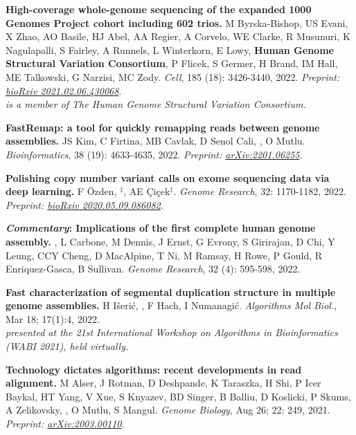 \vspace{-.2cm}
    {\bf High-coverage whole-genome sequencing of the expanded 1000 Genomes Project cohort including 602 trios.} M Byrska-Bishop, US Evani, X Zhao, AO Basile, HJ Abel, AA Regier, A Corvelo, WE Clarke, R Musunuri, K Nagulapalli, S Fairley, A Runnels, L Winterkorn, E Lowy, \textbf{Human Genome Structural Variation Consortium}, P Flicek, S Germer, H Brand, IM Hall, ME Talkowski, G Narzisi, MC Zody. {\it Cell}, 185 (18): 3426-3440, 2022.
    \textit{Preprint: \href{https://doi.org/10.1101/2021.02.06.430068}{bioRxiv 2021.02.06.430068}}.\\
    \hspace*{1cm}
    {\footnotesize \em \calkan{} is a member of The Human Genome Structural Variation Consortium.}

\vspace{-.2cm}
    {\bf FastRemap: a tool for quickly remapping reads between genome assemblies.}
    JS Kim, C Firtina, MB Cavlak, D Senol Cali, \calkan{}, O Mutlu.
    {\it Bioinformatics}, 38 (19): 4633-4635, 2022. \textit{Preprint: \href{https://doi.org/10.48550/arXiv.2201.06255}{arXiv:2201.06255}}.

\vspace{-.2cm}
    {\bf Polishing copy number variant calls on exome sequencing data via deep learning.}
    F Özden, \calkan{}$^\ddag$, AE Çiçek$^\ddag$. {\it Genome Research}, 32: 1170-1182, 2022. \textit{Preprint: \href{https://doi.org/10.1101/2020.05.09.086082}{bioRxiv 2020.05.09.086082}}.
    
\vspace{-.2cm}
    {\bf \textit{Commentary}: Implications of the first complete human genome assembly.} \calkan{}, L Carbone, M Dennis, J Ernst, G Evrony, S Girirajan, D Chi, Y Leung, CCY Cheng, D MacAlpine, T Ni, M Ramsay, H Rowe, P Gould, R Enriquez-Gasca, B Sullivan. {\it Genome Research}, 32 (4): 595-598, 2022.

\vspace{-.2cm}
    {\bf Fast characterization of segmental duplication structure in multiple genome assemblies.}
    H Išerić, \calkan{}, F Hach, I Numanagić.
    {\it Algorithms Mol Biol.}, Mar 18; 17(1):4, 2022.\\
    \hspace*{1cm}
    {\footnotesize \em presented at the 21st International Workshop on Algorithms in Bioinformatics (WABI 2021), held virtually.}


\vspace{-.2cm}
    {\bf Technology dictates algorithms: recent developments in read alignment.}
    M Alser, J Rotman, D Deshpande, K Taraszka, H Shi, P Icer Baykal, HT Yang, V Xue, S Knyazev, BD Singer, B Balliu, D Koslicki, P Skums, A Zelikovsky, \calkan{}, O Mutlu, S Mangul.
    {\it Genome Biology}, Aug 26; 22: 249, 2021.
    \textit{Preprint: \href{https://doi.org/10.48550/arXiv.2003.00110}{arXiv:2003.00110}}.

